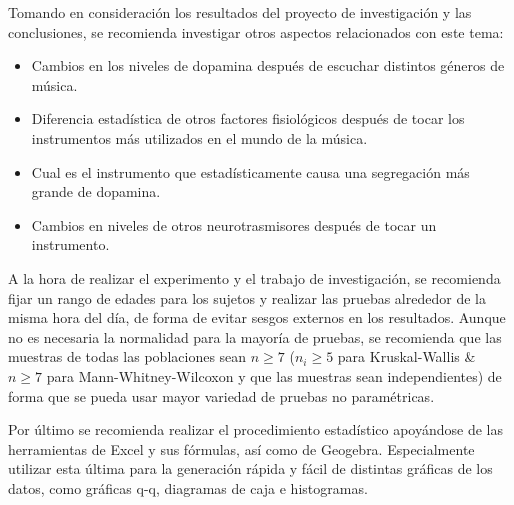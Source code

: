 Tomando en consideración los resultados del proyecto de investigación y las conclusiones, se recomienda investigar otros aspectos relacionados con este tema:  

\begin{itemize}
    \item Cambios en los niveles de dopamina después de escuchar distintos géneros de música.
    \item Diferencia estadística de otros factores fisiológicos después de tocar los instrumentos más utilizados en el mundo de la música.
    \item Cual es el instrumento que estadísticamente causa una segregación más grande de dopamina.
    \item Cambios en niveles de otros neurotrasmisores después de tocar un instrumento.
\end{itemize}

A la hora de realizar el experimento y el trabajo de investigación, se recomienda fijar un rango de edades para los sujetos y realizar las pruebas alrededor de la misma hora del día, de forma de evitar sesgos externos en los resultados. Aunque no es necesaria la normalidad para la mayoría de pruebas, se recomienda que las muestras de todas las poblaciones sean $n\geq 7$ ($n_i\geq 5$ para Kruskal-Wallis \& $n\geq 7$ para Mann-Whitney-Wilcoxon y que las muestras sean independientes) de forma que se pueda usar mayor variedad de pruebas no paramétricas. 


Por último se recomienda realizar el procedimiento estadístico apoyándose de las herramientas de Excel y sus fórmulas, así como de Geogebra. Especialmente utilizar esta última para la generación rápida y fácil de distintas gráficas de los datos, como gráficas q-q, diagramas de caja e histogramas.
